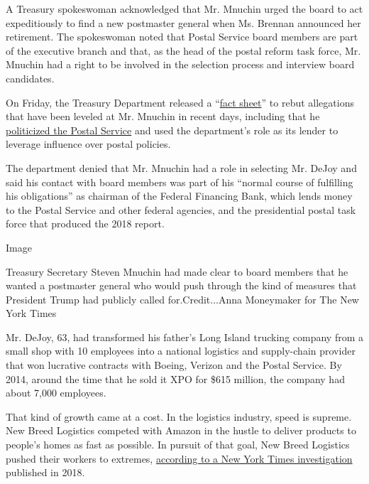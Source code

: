 A Treasury spokeswoman acknowledged that Mr. Mnuchin urged the board to
act expeditiously to find a new postmaster general when Ms. Brennan
announced her retirement. The spokeswoman noted that Postal Service
board members are part of the executive branch and that, as the head of
the postal reform task force, Mr. Mnuchin had a right to be involved in
the selection process and interview board candidates.

On Friday, the Treasury Department released a
``\href{https://home.treasury.gov/system/files/136/US-Treasury-Role-as-Lender-to-US-Postal-Service.pdf}{fact
sheet}'' to rebut allegations that have been leveled at Mr. Mnuchin in
recent days, including that he
\href{https://www.nytimes3xbfgragh.onion/2020/08/20/us/politics/former-postal-governor-tells-congress-mnuchin-politicized-postal-service.html}{politicized
the Postal Service} and used the department's role as its lender to
leverage influence over postal policies.

The department denied that Mr. Mnuchin had a role in selecting Mr. DeJoy
and said his contact with board members was part of his ``normal course
of fulfilling his obligations'' as chairman of the Federal Financing
Bank, which lends money to the Postal Service and other federal
agencies, and the presidential postal task force that produced the 2018
report.

Image

Treasury Secretary Steven Mnuchin had made clear to board members that
he wanted a postmaster general who would push through the kind of
measures that President Trump had publicly called for.Credit...Anna
Moneymaker for The New York Times

Mr. DeJoy, 63, had transformed his father's Long Island trucking company
from a small shop with 10 employees into a national logistics and
supply-chain provider that won lucrative contracts with Boeing, Verizon
and the Postal Service. By 2014, around the time that he sold it XPO for
\$615 million, the company had about 7,000 employees.

That kind of growth came at a cost. In the logistics industry, speed is
supreme. New Breed Logistics competed with Amazon in the hustle to
deliver products to people's homes as fast as possible. In pursuit of
that goal, New Breed Logistics pushed their workers to extremes,
\href{https://www.nytimes3xbfgragh.onion/interactive/2018/10/21/business/pregnancy-discrimination-miscarriages.html}{according
to a New York Times investigation} published in 2018.

